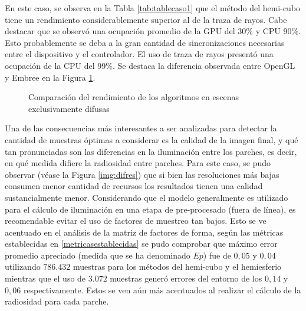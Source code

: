 En este caso, se observa en la Tabla \ref{tab:tablecaso1} que el método del hemi-cubo tiene un rendimiento considerablemente superior al de la traza de rayos. Cabe destacar que se observó una ocupación promedio de la GPU del 30\% y CPU 90\%. Esto probablemente se deba a la gran cantidad de sincronizaciones necesarias entre el dispositivo y el controlador. El uso de traza de rayos presentó una ocupación de la CPU del 99\%. Se destaca la diferencia observada entre OpenGL y Embree en la Figura \ref{plot:emglc1}.

\begin{figure}
\caption{Comparación del rendimiento de los algoritmos en escenas exclusivamente difusas}
\label{plot:emglc1}
\end{figure}

Una de las consecuencias más interesantes a ser analizadas para detectar la cantidad de muestras óptimas a considerar es la calidad de la imagen final, y qué tan pronunciadas son las diferencias en la iluminación entre los parches, es decir, en qué medida difiere la radiosidad entre parches. Para este caso, se pudo observar (véase la Figura \ref{img:difres}) que si bien las resoluciones más bajas consumen menor cantidad de recursos los resultados tienen una calidad sustancialmente menor. Considerando que el modelo generalmente es utilizado para el cálculo de iluminación en una etapa de pre-procesado (fuera de línea), es recomendable evitar el uso de factores de muestreo tan bajos. Esto se ve acentuado en el análisis de la matriz de factores de forma, según las métricas establecidas en \ref{metricasestablecidas} se pudo comprobar que máximo error promedio apreciado (medida que se ha denominado $Ep$) fue de $0,05$ y $0,04$ utilizando $786.432$ muestras para los métodos del hemi-cubo y el hemiesferio mientras que el uso de $3.072$ muestras generó errores del entorno de los $0,14$ y $0,06$ respectivamente. Estos se ven aún más acentuados al realizar el cálculo de la radiosidad para cada parche.

